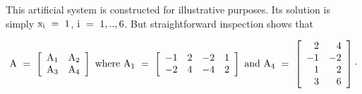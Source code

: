 This artificial system is constructed for illustrative purposes.
Its solution is simply ${\rm x_i~=~1}$, ${\rm i~=~1,..,6}$.
But straightforward inspection shows that

 \[ {\rm A}~=~\left[ \begin{array}{cc}
                          {\rm A}_1 & {\rm A}_2 \\
                          {\rm A}_3 & {\rm A}_4 \end{array}\right]~
            {\rm where}~{\rm A}_1~=~\left[ \begin{array}{cccc}
                                  -1 & 2 & -2 & 1\\
                                  -2 & 4 & -4 & 2  \end{array}\right]~
            {\rm and}~ {\rm A}_4~=~\left[ \begin{array}{rr}
                          2 & 4 \\
                         -1 & -2 \\
                          1 & 2 \\
                          3 & 6 \end{array} \right] \cdot \]

